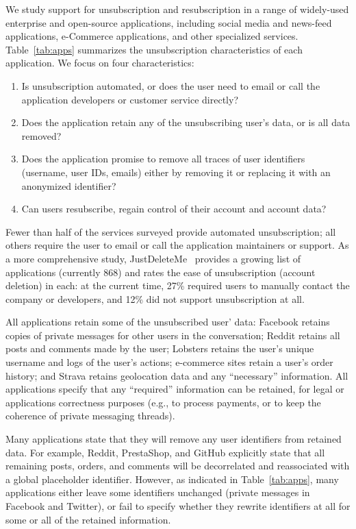 We study support for unsubscription and resubscription in a range of widely-used 
enterprise and open-source applications, including social media and news-feed applications, e-Commerce
applications, and other specialized services.
Table~\ref{tab:apps} summarizes the unsubscription characteristics of each application. We focus on
four characteristics: 
\begin{enumerate}
    \item Is unsubscription automated, or does the user need to email or call the
application developers or customer service directly? 
    \item Does the application retain any of the unsubscribing user's data, or is all data removed?
    \item Does the application promise to remove all traces of user identifiers (\eg username, user
    IDs, emails) either by removing it or replacing it with an anonymized identifier?  
    \item Can users resubscribe, \ie regain control of their account and account data?
\end{enumerate}
Fewer than half of the services surveyed provide automated unsubscription; all others require the
user to email or call the application maintainers or support. As a more comprehensive study,
JustDeleteMe~\cite{jdm} provides a growing list of applications (currently 868) and rates the ease
of unsubscription (account deletion) in each: at the current time, 27\% required users to manually
contact the company or developers, and 12\% did not support unsubscription at all. 

All applications retain some of the unsubscribed user' data: Facebook retains copies of private
messages for other users in the conversation; Reddit retains all posts and comments made by the
user; Lobsters retains the user's unique username and logs of the user's actions; e-commerce sites
retain a user's order history; and Strava retains geolocation data and any ``necessary''
information. All applications specify that any ``required'' information can be retained, for legal
or applications correctness purposes (e.g., to process payments, or to keep the coherence of private
messaging threads).  

Many applications state that they will remove any user identifiers from retained data.  For example,
Reddit, PrestaShop, and GitHub explicitly state that all remaining posts, orders, and comments will
be decorrelated and reassociated with a global placeholder identifier.  However, as indicated in
Table~\ref{tab:apps}, many applications either leave some identifiers unchanged (\eg private
messages in Facebook and Twitter), or fail to specify whether they rewrite identifiers at all for
some or all of the retained information.

